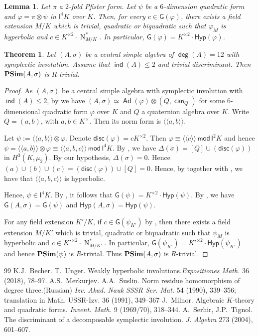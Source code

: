\documentclass[10pt,a4paper]{amsart}
\newtheorem{lem}{Lemma}
\newtheorem{thm}{Theorem}
\newcommand\Ad{\operatorname{\mathsf{Ad}}}
\newcommand{\G}{\mathsf{G}}
\newcommand{\Hyp}{\mathsf{Hyp}}
\newcommand{\I}{\mathsf{I}}
\newcommand\N{\operatorname{N}}
\newcommand{\can}{\operatorname{\mathsf{can}}}
\renewcommand{\deg}{\operatorname{\mathsf{deg}}}
\newcommand{\disc}{\mathsf{disc}}
\newcommand\ind{\operatorname{\mathsf{ind}}}
\newcommand{\la}{\langle}
\renewcommand{\leq}{\leqslant}
\newcommand{\lla}{\la\!\la}
\newcommand{\mg}[1]{{#1}^{\times}}
\renewcommand{\mod}{\,\mathsf{mod}\,}
\newcommand{\ra}{\rangle}
\newcommand{\rra}{\ra\!\ra}
\newcommand{\s}{\sigma}
\newcommand{\sq}[1]{{#1}^{\times 2}}
\newcommand{\vf}{\varphi}
\begin{document}
    \begin{lem}\label{24}
      Let $\pi$ a $2$-fold Pfister form. Let $\psi$ be a $6$-dimension quadratic form and $\vf=\pi\otimes \psi$ in $\I^4K$ over $K$. 
      Then, for every $c\in \G(\vf)$, there exists a field extension $M/K$ which is trivial, quadratic or biquadratic such that $\vf_{M}$ is hyperbolic and $c\in\sq{K}\cdot \N_{M/K}^\ast$. In particular, $\G(\vf)=\sq{K}\cdot\Hyp(\vf)$.
    \end{lem}

\begin{thm}\label{6}
    Let $(A,\s)$ be a central simple algebra of $\deg(A)=12$ with symplectic involution. Assume that $\ind(A)\leq 2$ and trivial discriminant. Then  ${\bf PSim}(A,\s)$ is $R$-trivial.
\end{thm}

\begin{proof}
     As $(A,\s)$ be a central simple algebra with symplectic involution with $\ind(A)\leq 2$, by \cite[Prop. 3.4]{BU18} we have $(A,\s)\simeq \Ad(\vf)\otimes (Q,\can_Q)$ for some $6$-dimensional quadratic form $\vf$ over $K$ and $Q$ a quaternion algebra over $K$. 
     Write $Q=(a,b)$, with $a,b\in\mg{K}$. Then its norm form is $\lla a,b\rra$.
 
Let $\psi:=\lla a, b \rra \otimes \vf$.
Denote $\disc(\vf)=c\sq{K}$. 
Then $\vf \equiv \lla c \rra \mod \I^2K$ and hence $\psi=\lla a, b\rra \otimes \vf \equiv \lla a, b ,c\rra \mod \I^4K$. 
By \cite[Main Theorem]{ST04}, we have $\Delta(\s)=[Q]\cup(\disc(\vf))$ in $H^3(K,\mu_2)$.
By our hypothesis, $\Delta(\s)=0$.
Hence 
$(a)\cup(b)\cup (c)=(\disc(\vf))\cup[Q]=0$.   
Hence, by \cite[Theorem 5.1]{MS91} together with \cite[Theorem 4.1]{Mil70}, we have that $\lla a,b,c\rra$ is hyperbolic.

 
 
Hence, $\psi\in \I^4K$. 
By , it follows that $\G(\psi)=\sq{K}\cdot\Hyp(\psi)$. 
By , we have $\G(A,\s)=\G(\psi)$ and $\Hyp(A,\s)=\Hyp(\psi)$. 

 For any field extension $K'/K$, if $c\in \G(\psi_{K'})$ by , then there exists a field extension $M/K'$ which is trivial, quadratic or biquadratic such that $\psi_M$ is hyperbolic and $c\in\sq{K'}\cdot \N_{M/K'}^\ast$. In particular, $\G(\psi_{K'})=\sq{K'}\cdot\Hyp(\psi_{K'})$ and hence ${\bf PSim}(\psi)$ is $R$-trivial. Thus ${\bf PSim}(A,\s)$ is $R$-trivial.
\end{proof}

\begin{thebibliography}{99}
 K.J.~Becher. T.~Unger. Weakly hyperbolic involutions.\emph{Expositiones Math.} 36 (2018), 78--97.
 A.S.~Merkurjev. A.A.~Suslin. Norm residue homomorphism of degree three.(Russian) \emph{Izv. Akad. Nauk SSSR Ser. Mat.} 54 (1990), 339--356; translation in Math. USSR-Izv. 36 (1991), 349--367
 J.~Milnor. Algebraic $K$-theory and quadratic forms. \emph{Invent. Math.} 9 (1969/70), 318–344.
 A.~Serhir, J.P.~Tignol. The discriminant of a decomposable symplectic involution. \emph{J. Algebra} 273 (2004), 601--607.
\end{thebibliography}
\end{document}
